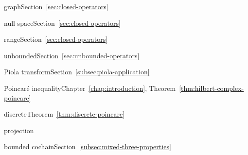 \par\noindent\hspace*{1em}\label{index:operator-graph}{graph}\quad Section~\ref{sec:closed-operators}

\par\noindent\hspace*{1em}\label{index:operator-null-space}{null space}\quad Section~\ref{sec:closed-operators}

\par\noindent\hspace*{1em}\label{index:operator-range}{range}\quad Section~\ref{sec:closed-operators}

\par\noindent\hspace*{1em}\label{index:operator-unbounded}{unbounded}\quad Section~\ref{sec:unbounded-operators}

\par\noindent\hspace*{0em}\label{index:piola-transform}{Piola transform}\quad Section~\ref{subsec:piola-application}

\par\noindent\hspace*{0em}\label{index:poincar-inequality}{Poincaré inequality}\quad Chapter~\ref{chap:introduction}, Theorem~\ref{thm:hilbert-complex-poincare}

\par\noindent\hspace*{1em}\label{index:poincar-inequality-discrete}{discrete}\quad Theorem~\ref{thm:discrete-poincare}

\par\noindent\hspace*{0em}\label{index:projection}{projection}

\par\noindent\hspace*{1em}\label{index:projection-bounded-cochain}{bounded cochain}\quad Section~\ref{subsec:mixed-three-properties}

